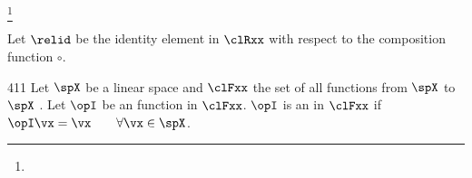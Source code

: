 \begin{definition}
\label{def:rel_id}
\footnote{
  }
\end{definition}


\begin{proposition}
Let $\relid$ be the identity element in $\clRxx$ with respect to the composition function $\circ$.
\propbox{
  \relid \circ \rel = \rel \circ \relid = \rel
  \qquad\forall\rel\in\clRxx
  }
\end{proposition}


\begin{example}
\label{ex:opI}
\citep{michel1993}{411}
Let $\spX$ be a linear space
and $\clFxx$ the set of all functions from $\spX$ to $\spX$ .
Let $\opI$ be an function in $\clFxx$.
\indxs{\opI}
$\opI$ is an  in $\clFxx$ if 
$\opI\vx =\vx \qquad \forall \vx\in\spX$.
\end{example}

